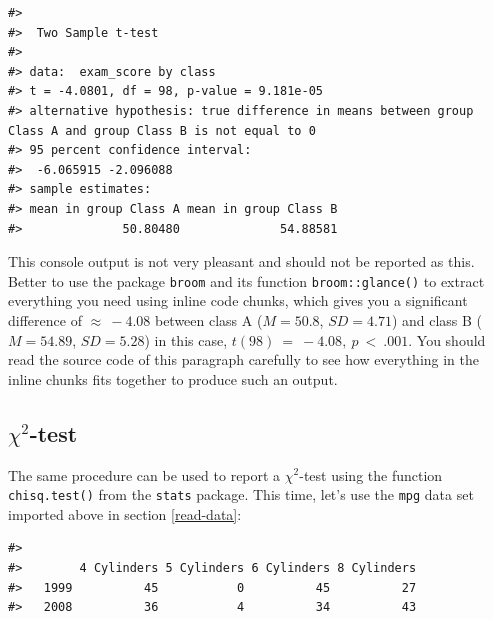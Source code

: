 \documentclass[
  11pt,
  a4paper,
  twoside]{scrbook}
\newenvironment{Shaded}{\begin{snugshade}}{\end{snugshade}}
\newcommand{\CommentTok}[1]{\textcolor[rgb]{0.56,0.35,0.01}{\textit{#1}}}
\newcommand{\FunctionTok}[1]{\textcolor[rgb]{0.00,0.00,0.00}{#1}}
\newcommand{\NormalTok}[1]{#1}
\newcommand{\OtherTok}[1]{\textcolor[rgb]{0.56,0.35,0.01}{#1}}
\newcommand{\SpecialCharTok}[1]{\textcolor[rgb]{0.00,0.00,0.00}{#1}}
\begin{document}
\linespread{1}

\begin{verbatim}
#> 
#>  Two Sample t-test
#> 
#> data:  exam_score by class
#> t = -4.0801, df = 98, p-value = 9.181e-05
#> alternative hypothesis: true difference in means between group Class A and group Class B is not equal to 0
#> 95 percent confidence interval:
#>  -6.065915 -2.096088
#> sample estimates:
#> mean in group Class A mean in group Class B 
#>              50.80480              54.88581
\end{verbatim}

This console output is not very pleasant and should not be reported as this. Better to use the package \texttt{broom} and its function \texttt{broom::glance()} to extract everything you need using inline code chunks, which gives you a significant difference of \(\approx~-4.08\) between class A (\(M = 50.8\), \(SD = 4.71\)) and class B (\(M = 54.89\), \(SD = 5.28\)) in this case, \(t(98)~=~-4.08,~p~<~.001\). You should read the source code of this paragraph carefully to see how everything in the inline chunks fits together to produce such an output.

\hypertarget{chi2-test}{%
\subsection{\texorpdfstring{\(\chi^2\)-test}{\textbackslash chi\^{}2-test}}\label{chi2-test}}

The same procedure can be used to report a \(\chi^2\)-test using the function \texttt{chisq.test()} from the \texttt{stats} package. This time, let's use the \texttt{mpg} data set imported above in section \ref{read-data}:

\linespread{1}

\begin{Shaded}
\end{Shaded}

\linespread{1}

\begin{verbatim}
#>       
#>        4 Cylinders 5 Cylinders 6 Cylinders 8 Cylinders
#>   1999          45           0          45          27
#>   2008          36           4          34          43
\end{verbatim}
\end{document}
